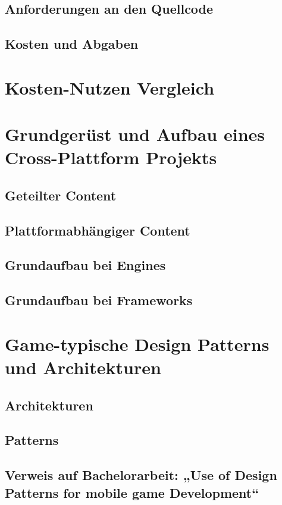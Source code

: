 \section{Anforderungen an den Quellcode}
\section{Kosten und Abgaben}

\chapter{Kosten-Nutzen Vergleich}

\chapter{Grundgerüst und Aufbau eines Cross-Plattform Projekts}
\section{Geteilter Content}
\section{Plattformabhängiger Content}
\section{Grundaufbau bei Engines}
\section{Grundaufbau bei Frameworks}

\chapter{Game-typische Design Patterns und Architekturen}
\section{Architekturen}
\section{Patterns}
\section{Verweis auf Bachelorarbeit: „Use of Design Patterns for mobile game Development“}

